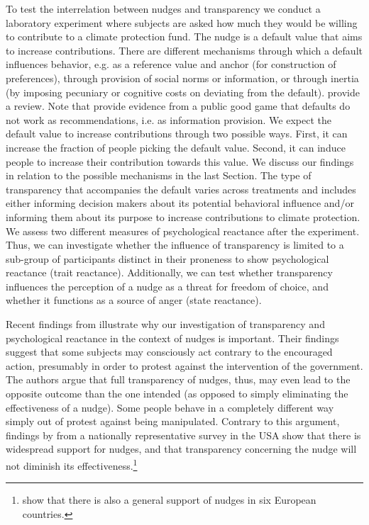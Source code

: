 \documentclass[review, authoryear,12pt]{elsarticle}
\begin{document}
To test the interrelation between nudges and transparency we conduct a laboratory experiment where subjects are asked how much they would be willing to contribute to a climate protection fund. The nudge is a default value that aims to increase contributions.
There are different mechanisms through which a default influences behavior, e.g. as a reference value and anchor (for construction of preferences), through provision of social norms or information, or through inertia (by imposing pecuniary or cognitive costs on deviating from the default). \cite{Sunstein.2016d} provide a review. Note that \cite{Cappelletti.2014} provide evidence from a public good game that defaults do not work as recommendations, i.e. as information provision.  We expect the default value to increase contributions through two possible ways. First, it can increase the fraction of people picking the default value. Second, it can induce people to increase their contribution towards this value. We discuss our findings in relation to the possible mechanisms in the last Section.
The type of transparency that accompanies the default varies across treatments and includes either informing decision makers about its potential behavioral influence and/or informing them about its purpose to increase contributions to climate protection. We assess two different measures of psychological reactance after the experiment. Thus, we can investigate whether the influence of transparency is limited to a sub-group of participants distinct in their proneness to show psychological reactance (trait reactance). Additionally, we can test whether transparency influences the perception of a nudge as a threat for freedom of choice, and whether it functions as a source of anger (state reactance).

Recent findings from \cite{Arad.2015} illustrate why our investigation of transparency and psychological reactance in the context of nudges is important. Their findings suggest that some subjects may consciously act contrary to the encouraged action, presumably in order to protest against the intervention of the government. The authors argue that full transparency of nudges, thus, may even lead to the opposite outcome than the one intended (as opposed to simply eliminating the effectiveness of a nudge). Some people behave in a completely different way simply out of protest against being manipulated. Contrary to this argument, findings by \cite{Sunstein.2016} from a nationally representative survey in the USA show that there is widespread support for nudges, and that transparency concerning the nudge will not diminish its effectiveness.\footnote{\cite{Reisch.2016} show that there is also a general support of nudges in six European countries.}
\end{document}
